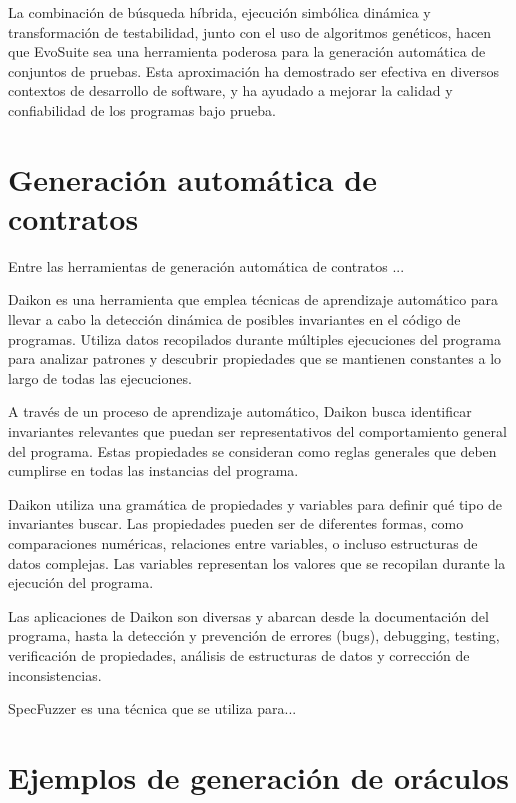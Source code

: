 La combinación de búsqueda híbrida, ejecución simbólica dinámica y transformación de testabilidad, junto con el uso de algoritmos genéticos, hacen que EvoSuite sea una herramienta poderosa para la generación automática de conjuntos de pruebas. Esta aproximación ha demostrado ser efectiva en diversos contextos de desarrollo de software, y ha ayudado a mejorar la calidad y confiabilidad de los programas bajo prueba.


\section{Generación automática de contratos}

Entre las herramientas de generación automática de contratos ...

Daikon es una herramienta que emplea técnicas de aprendizaje automático para llevar a cabo la detección dinámica de posibles invariantes en el código de programas. Utiliza datos recopilados durante múltiples ejecuciones del programa para analizar patrones y descubrir propiedades que se mantienen constantes a lo largo de todas las ejecuciones.

A través de un proceso de aprendizaje automático, Daikon busca identificar invariantes relevantes que puedan ser representativos del comportamiento general del programa. Estas propiedades se consideran como reglas generales que deben cumplirse en todas las instancias del programa.

Daikon utiliza una gramática de propiedades y variables para definir qué tipo de invariantes buscar. Las propiedades pueden ser de diferentes formas, como comparaciones numéricas, relaciones entre variables, o incluso estructuras de datos complejas. Las variables representan los valores que se recopilan durante la ejecución del programa.

Las aplicaciones de Daikon son diversas y abarcan desde la documentación del programa, hasta la detección y prevención de errores (bugs), debugging, testing, verificación de propiedades, análisis de estructuras de datos y corrección de inconsistencias.


SpecFuzzer es una técnica que se utiliza para...

\section{Ejemplos de generación de oráculos}


